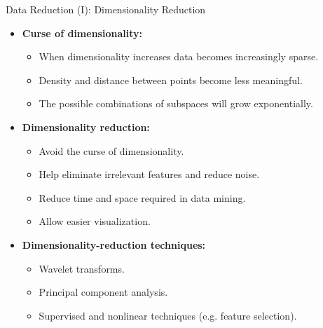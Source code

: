 \begin{frame}{Data Reduction (I): Dimensionality Reduction}
	\begin{itemize}
		\item \textbf{Curse of dimensionality:}
		\begin{itemize}
			\item When dimensionality increases data becomes increasingly 
			sparse.
			\item Density and distance between points become less meaningful.
			\item The possible combinations of subspaces will grow 
			exponentially.
		\end{itemize}
		\item \textbf{Dimensionality reduction:}
		\begin{itemize}
			\item Avoid the curse of dimensionality.
			\item Help eliminate irrelevant features and reduce noise.
			\item Reduce time and space required in data mining.
			\item Allow easier visualization.
		\end{itemize}
		\item \textbf{Dimensionality-reduction techniques:}
		\begin{itemize}
			\item Wavelet transforms.
			\item Principal component analysis.
			\item Supervised and nonlinear techniques (e.g. feature selection).
		\end{itemize}
	\end{itemize}
\end{frame}

